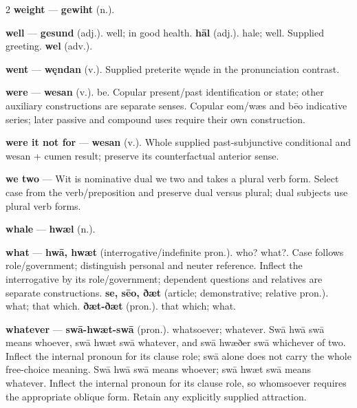 \begin{multicols}{2}
\textbf{weight} — \textbf{gewiht} (n.).\par
\textbf{well} — \textbf{gesund} (adj.). well; in good health. \textbf{hāl} (adj.). hale; well. Supplied greeting. \textbf{wel} (adv.).\par
\textbf{went} — \textbf{węndan} (v.). Supplied preterite węnde in the pronunciation contrast.\par
\textbf{were} — \textbf{wesan} (v.). be. Copular present/past identification or state; other auxiliary constructions are separate senses. Copular eom/wæs and bēo indicative series; later passive and compound uses require their own construction.\par
\textbf{were it not for} — \textbf{wesan} (v.). Whole supplied past-subjunctive conditional and wesan + cumen result; preserve its counterfactual anterior sense.\par
\textbf{we two} — Wit is nominative dual we two and takes a plural verb form. Select case from the verb/preposition and preserve dual versus plural; dual subjects use plural verb forms.\par
\textbf{whale} — \textbf{hwæl} (n.).\par
\textbf{what} — \textbf{hwā, hwæt} (interrogative/indefinite pron.). who? what?. Case follows role/government; distinguish personal and neuter reference. Inflect the interrogative by its role/government; dependent questions and relatives are separate constructions. \textbf{se, sēo, ðæt} (article; demonstrative; relative pron.). what; that which. \textbf{ðæt-ðæt} (pron.). that which; what.\par
\textbf{whatever} — \textbf{swā-hwæt-swā} (pron.). whatsoever; whatever. Swā hwā swā means whoever, swā hwæt swā whatever, and swā hwæðer swā whichever of two. Inflect the internal pronoun for its clause role; swā alone does not carry the whole free-choice meaning. Swā hwā swā means whoever; swā hwæt swā means whatever. Inflect the internal pronoun for its clause role, so whomsoever requires the appropriate oblique form. Retain any explicitly supplied attraction.\par

\end{multicols}
